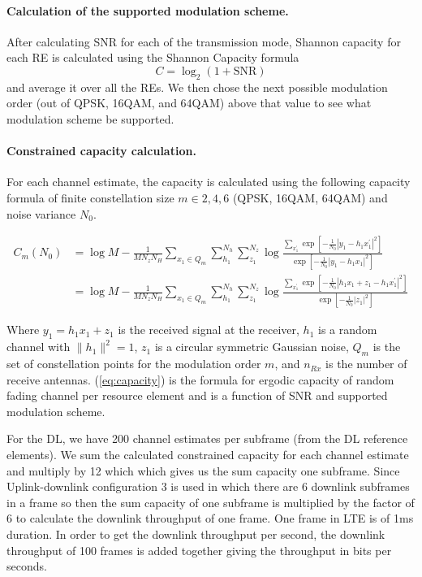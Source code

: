 \documentclass[a4paper,10pt]{article}
\begin{document}
\paragraph{Calculation of the supported modulation scheme.}
After calculating SNR for each of the transmission mode, Shannon capacity for each RE is calculated using the Shannon Capacity formula $$C = \log_2(1 + \mathrm{SNR})$$ and average it over all the REs. We then chose the next possible modulation order (out of QPSK, 16QAM, and 64QAM) above that value  to see what modulation scheme be supported. 

\paragraph{Constrained capacity calculation.}
For each channel estimate, the capacity is calculated using the following capacity formula of finite constellation size $m \in {2,4,6}$ (QPSK, 16QAM, 64QAM) and noise variance $N_0$.

\begin{align}
C_m\left(N_0\right)
&=\log M-\frac{1}{MN_{z}N_{H}}\sum_{x_{1}\in{Q_m}}\sum_{h_1}^{N_{h}}\sum_{z_{1}}^{N_{z}}\log\frac{\sum_{x^{'}_{1}}\exp\left[-\frac{1}{N_{0}}\left|y_{1}-h_{1}x^{'}_{1}\right|^2\right]}{\exp\left[-\frac{1}{N_{0}}\left|y_{1}-h_{1}x_{1}\right|^{2}\right]}\nonumber\\
&=\log M-\frac{1}{MN_{z}N_{H}}\sum_{x_{1}\in{Q_m}}\sum_{h_1}^{N_{h}}\sum_{z_{1}}^{N_{z}}\log\frac{\sum_{x^{'}_{1}}\exp\left[-\frac{1}{N_{0}}\left|h_{1}x_{1} + z_1 - h_1x^{'}_{1}\right|^2\right]}{\exp\left[-\frac{1}{N_{0}}\left|z_{1}\right|^{2}\right]}
\label{eq:capacity}
\end{align}

Where $y_1 = h_1x_1 + z_1$ is the received signal at the receiver, $h_1$ is a random channel with $\|h_1\|^2=1$, $z_1$ is a circular symmetric Gaussian noise, $Q_m$ is the set of constellation points for the modulation order $m$, and $n_{Rx}$ is the number of receive antennas. (\ref{eq:capacity}) is the formula for ergodic capacity of random fading channel per resource element and is a function of SNR and supported modulation scheme. 

For the DL, we have 200 channel estimates per subframe (from the DL reference elements). We sum the calculated constrained capacity for each channel estimate and multiply by 12 which which gives us the sum capacity one subframe. Since Uplink-downlink configuration 3 is used in which there are 6 downlink subframes in a frame so then the sum capacity of one subframe is multiplied by the factor of 6 to calculate the downlink throughput of one frame. One frame in LTE is of 1ms duration. In order to get the downlink throughput per second, the downlink throughput of 100 frames is added together giving the throughput in bits per seconds.
\end{document}
